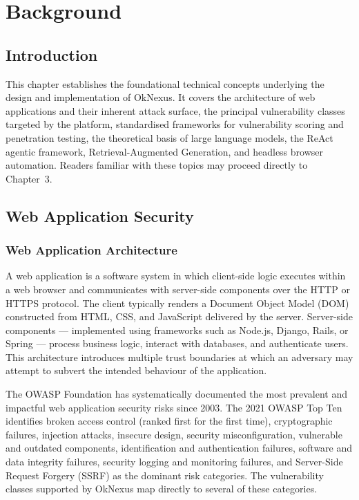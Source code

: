 \chapter{Background}

\section{Introduction}

This chapter establishes the foundational technical concepts underlying the design and implementation of OkNexus. It covers the architecture of web applications and their inherent attack surface, the principal vulnerability classes targeted by the platform, standardised frameworks for vulnerability scoring and penetration testing, the theoretical basis of large language models, the ReAct agentic framework, Retrieval-Augmented Generation, and headless browser automation. Readers familiar with these topics may proceed directly to Chapter~3.

\section{Web Application Security}

\subsection{Web Application Architecture}

A web application is a software system in which client-side logic executes within a web browser and communicates with server-side components over the HTTP or HTTPS protocol. The client typically renders a Document Object Model (DOM) constructed from HTML, CSS, and JavaScript delivered by the server. Server-side components --- implemented using frameworks such as Node.js, Django, Rails, or Spring --- process business logic, interact with databases, and authenticate users. This architecture introduces multiple trust boundaries at which an adversary may attempt to subvert the intended behaviour of the application.

The OWASP Foundation has systematically documented the most prevalent and impactful web application security risks since 2003. The 2021 OWASP Top Ten \cite{owasp2021} identifies broken access control (ranked first for the first time), cryptographic failures, injection attacks, insecure design, security misconfiguration, vulnerable and outdated components, identification and authentication failures, software and data integrity failures, security logging and monitoring failures, and Server-Side Request Forgery (SSRF) as the dominant risk categories. The vulnerability classes supported by OkNexus map directly to several of these categories.

